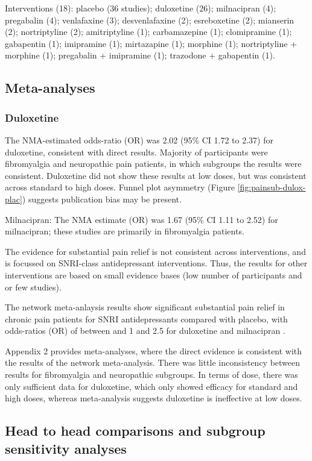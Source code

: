 \documentclass{report}\usepackage[]{graphicx}\usepackage[]{color}
\begin{document}
Interventions (18): placebo (36 studies); duloxetine (26); milnacipran (4); pregabalin (4); venlafaxine (3); desvenlafaxine (2); esreboxetine (2); mianserin (2); nortriptyline (2); amitriptyline (1); carbamazepine (1); clomipramine (1); gabapentin (1); imipramine (1); mirtazapine (1); morphine (1); nortriptyline + morphine (1); pregabalin + imipramine (1); trazodone + gabapentin (1).

\subsection{Meta-analyses}

\subsubsection{Duloxetine}

The NMA-estimated odds-ratio (OR) was 2.02 (95\% CI 1.72 to 2.37) for duloxetine, consistent with direct results. Majority of participants were fibromyalgia and neuropathic pain patients, in which subgroups the results were consistent. Duloxetine did not show these results at low doses, but was consistent across standard to high doses. Funnel plot asymmetry (Figure \ref{fig:painsub-dulox-plac}) suggests publication bias may be present.


Milnacipran: The NMA estimate (OR) was 1.67 (95\% CI 1.11 to 2.52) for milnacipran; these studies are primarily in fibromyalgia patients.

 The evidence for substantial pain relief is not consistent across interventions, and is focussed on SNRI-class antidepressant interventions. Thus, the results for other interventions are based on small evidence bases (low number of participants and or few studies).

The network meta-anlaysis results show significant substantial pain relief in chronic pain patients for SNRI antidepressants compared with placebo, with odds-ratios (OR) of between and 1 and 2.5 for duloxetine and milnacipran .

Appendix 2 provides meta-analyses, where the direct evidence is consistent with the results of the network meta-analysis. There was little inconsistency between results for fibromyalgia and neuropathic subgroups.  In terms of dose, there was only sufficient data for duloxetine, which only showed efficacy for standard and high doses,  whereas meta-analysis suggests duloxetine is ineffective at low doses.

\subsection{Head to head comparisons and subgroup sensitivity analyses}
\end{document}

